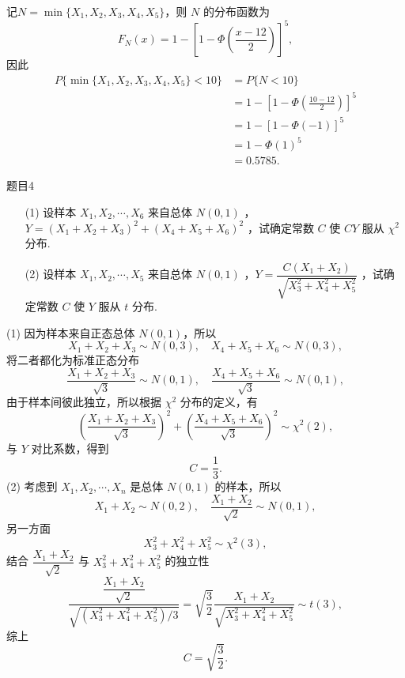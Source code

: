 \begin{solution}
$$    $$
    记$N = \min\{X_1, X_2, X_3, X_4, X_5\}$，则 $N$ 的分布函数为
    $$
        F_N(x) = 1 - \left[1-\Phi\left(\frac{x-12}{2}\right)\right]^5,
    $$
    因此
    $$
        \begin{aligned}
            P\{\min\{X_1, X_2, X_3, X_4, X_5\} < 10\}
             & = P\{N<10\}                                               \\
             & = 1 - \left[1 - \Phi\left(\frac{10-12}{2}\right)\right]^5 \\
             & = 1 - [1-\Phi(-1)]^5                                      \\
             & = 1 - \Phi(1)^5                                           \\
             & = 0.5785.
        \end{aligned}
    $$
\end{solution}






\begin{question}{题目4}
    \begin{enumerate}
        \item [(1)] 设样本 $X_1, X_2, \cdots, X_6$ 来自总体 $N(0,1)$ ，$Y=(X_1+X_2+X_3)^2 + (X_4+X_5+X_6)^2$ ，试确定常数 $C$ 使 $CY$ 服从 $\chi^2$ 分布.
        \item [(2)] 设样本 $X_1, X_2, \cdots, X_5$ 来自总体 $N(0,1)$ ，$Y = \dfrac{C(X_1+X_2)}{\sqrt{X_3^2 + X_4^2 + X_5^2}}$ ，试确定常数 $C$ 使 $Y$ 服从 $t$ 分布.
    \end{enumerate}
\end{question}
\begin{solution}
    (1) 因为样本来自正态总体 $N(0,1)$，所以
    $$
        X_1 + X_2 + X_3 \sim N(0, 3), \quad
        X_4 + X_5 + X_6 \sim N(0, 3),
    $$
    将二者都化为标准正态分布
    $$
        \frac{X_1 + X_2 + X_3}{\sqrt{3}} \sim N(0, 1), \quad
        \frac{X_4 + X_5 + X_6}{\sqrt{3}} \sim N(0, 1),
    $$
    由于样本间彼此独立，所以根据 $\chi^2$ 分布的定义，有
    $$
        \left(\frac{X_1 + X_2 + X_3}{\sqrt{3}}\right)^2 + \left(\frac{X_4 + X_5 + X_6}{\sqrt{3}}\right)^2 \sim \chi^2(2),
    $$
    与 $Y$ 对比系数，得到
    $$
        C = \frac{1}{3}.
    $$
    (2) 考虑到 $X_1, X_2, \cdots, X_n$ 是总体 $N(0,1)$ 的样本，所以
    $$
        X_1 + X_2 \sim N(0,2), \quad \frac{X_1 + X_2}{\sqrt{2}} \sim N(0,1),
    $$
    另一方面
    $$
        X_3^2 + X_4^2 + X_5^2 \sim \chi^2(3),
    $$
    结合 $\dfrac{X_1 + X_2}{\sqrt{2}}$ 与 $X_3^2 + X_4^2 + X_5^2$ 的独立性
    $$
        \frac{\dfrac{X_1+X_2}{\sqrt{2}}}{\sqrt{(X_3^2 + X_4^2 + X_5^2)/3}}
        = \sqrt{\frac{3}{2}} \frac{X_1+X_2}{\sqrt{X_3^2 + X_4^2 + X_5^2}}
        \sim t(3),
    $$
    综上
    $$
        C = \sqrt{\frac{3}{2}}.
    $$
\end{solution}





